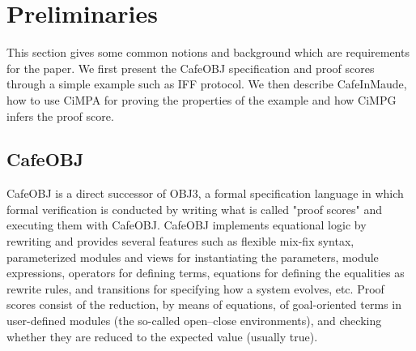 \documentclass[a4paper,fleqn]{cas-dc}
\begin{document}

\section{Preliminaries}\label{pre}
This section gives some common notions and background which are requirements for the paper. We first present the CafeOBJ specification and proof scores through a simple example such as IFF protocol. We then describe CafeInMaude, how to use CiMPA for proving the properties of the example and how CiMPG infers the proof score.

\subsection{CafeOBJ} \label{cafeobj}
CafeOBJ \cite{DiaconescuF98amast} is a direct successor of OBJ3, a formal specification language in which formal verification is conducted by writing what is called "proof scores" \cite{OgataF03fmoods} and executing them with CafeOBJ. CafeOBJ implements equational logic by rewriting and provides several features such as flexible mix-fix syntax, parameterized modules and views for instantiating the parameters, module expressions, operators for defining terms, equations for defining the equalities as rewrite rules, and transitions for specifying how a system evolves, etc. Proof scores consist of the reduction, by means of equations, of goal-oriented terms in user-defined modules (the so-called open–close environments), and checking whether they are reduced to the expected value (usually true). 
\end{document}

